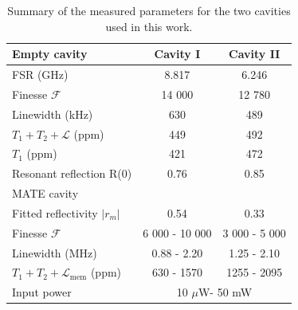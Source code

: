 \begin{table}[b!]
    \centering
    \captionsetup{width=0.55\linewidth}
    \begin{tabular}{lcc}
        Empty cavity & Cavity I &Cavity II   \\
        \hline
        FSR (GHz)                  & 8.817 & 6.246  \\
        Finesse $\mathcal{F}$& 14 000 & 12 780 \\
        Linewidth (kHz)            & 630 & 489\\
        $T_1 + T_2 + \mathcal{L}$ (ppm) & 449 & 492  \\
        $T_1$ (ppm) & 421 & 472 \\
        Resonant reflection R(0) & 0.76 & 0.85 \\[0.6em]

        MATE cavity & \quad & \quad  \\
        \hline
        Fitted reflectivity $|r_m|$ & 0.54 & 0.33 \\
        Finesse $\mathcal{F}$ &  6 000 - 10 000 &  3 000 - 5 000 \\ 
        Linewidth  (MHz) & 0.88 - 2.20 &  1.25 - 2.10 \\  
        $T_1 + T_2 + \mathcal{L}_{\text{mem}}$ (ppm) & 630 - 1570 &  1255 - 2095 \\
        Input power        &  \multicolumn{2}{c}{10 $\mu$W- 50 mW}   \\

    \end{tabular}
    \caption{Summary of the measured parameters for the two cavities used in this work.}
    \label{tab:measure_mate_parameters}
\end{table}    


